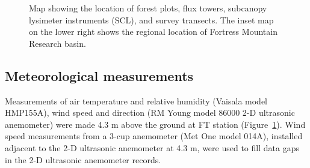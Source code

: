 \documentclass[
  letterpaper,
  DIV=11,
  numbers=noendperiod]{scrartcl}
\begin{document}
\begin{figure}[H]


\caption{\label{fig-site-map}Map showing the location of forest plots,
flux towers, subcanopy lysimeter instruments (SCL), and survey
transects. The inset map on the lower right shows the regional location
of Fortress Mountain Research basin.}

\end{figure}%

\subsection{Meteorological
measurements}\label{meteorological-measurements}

Measurements of air temperature and relative humidity (Vaisala model
HMP155A), wind speed and direction (RM Young model 86000 2-D ultrasonic
anemometer) were made 4.3 m above the ground at FT station
(Figure~\ref{fig-site-map}). Wind speed measurements from a 3-cup
anemometer (Met One model 014A), installed adjacent to the 2-D
ultrasonic anemometer at 4.3 m, were used to fill data gaps in the 2-D
ultrasonic anemometer records.
\end{document}
